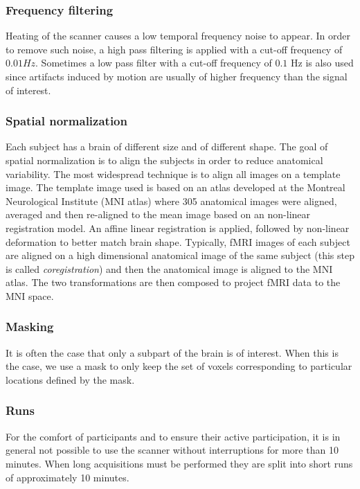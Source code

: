 \subsubsection{Frequency filtering}
Heating of the scanner causes a low temporal frequency noise to appear. In order
to remove such noise, a high pass filtering is applied with a cut-off frequency
of $0.01 Hz$. Sometimes a low pass filter with a cut-off frequency of $0.1$ Hz is also used since artifacts induced by motion are usually of higher frequency than the signal of interest.

\subsubsection{Spatial normalization}
Each subject has a brain of different size and of different shape.
The goal of spatial normalization is to align the subjects in order to reduce anatomical variability.
The most widespread technique is to align all images on a template image. The
template image used is based on an atlas developed at the Montreal Neurological
Institute (MNI atlas) where 305 anatomical images were aligned, averaged and then re-aligned to the mean image based on an non-linear registration model.
An affine linear registration is applied, followed by non-linear deformation to better match brain shape. Typically, fMRI images of each subject are aligned on a high dimensional anatomical image of the same subject (this step is called \emph{coregistration}) and then the anatomical image is aligned to the MNI atlas. The two transformations are then composed to project fMRI data to the MNI space.

\subsubsection{Masking}
It is often the case that only a subpart of the brain is of interest. When this is the case, we use a mask to only keep the set of voxels corresponding to particular locations defined by the mask.

\subsubsection{Runs}
For the comfort of participants and to ensure their active participation, it is in general not possible to use the scanner without interruptions for more than 10 minutes.  When long acquisitions must be
performed they are split into short runs of approximately 10 minutes.


